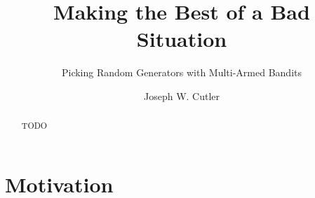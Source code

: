 \documentclass[sigconf,nonacm]{acmart}
\begin{document}
\title{Making the Best of a Bad Situation}
\subtitle{Picking Random Generators with Multi-Armed Bandits}

\author{Joseph W. Cutler}

\renewcommand{\shortauthors}{Cutler}

\begin{abstract}
    TODO
\end{abstract}

\maketitle


\section{Motivation}
\end{document}
